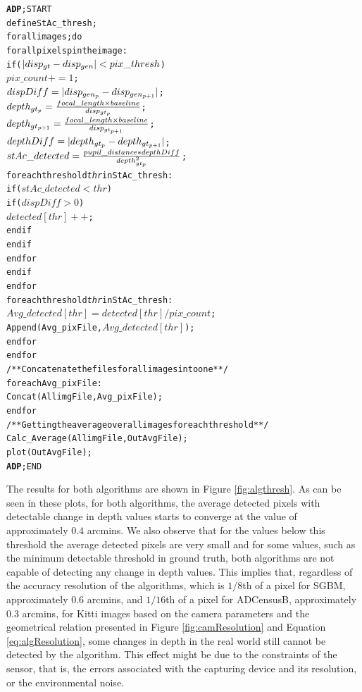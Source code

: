 \begin{alltt}
\textbf{ADP}; START
      define StAc\_thresh;
      for all images; do
         for all pixels p in the image:
            if (\( |disp\sb{gt}-disp\sb{gen}|<pix\_thresh\))
               \(pix\_count += 1\);
               \(dispDiff = |disp\sb{gen\sb{p}}-disp\sb{gen\sb{p+1}}|\);
               \(depth\sb{gt\sb{p}} = \frac{focal\_length \times baseline}{disp\sb{gt\sb{p}}}\);
               \(depth\sb{gt\sb{p+1}} = \frac{focal\_length \times baseline}{disp\sb{gt\sb{p+1}}}\);
               \(depthDiff = |depth\sb{gt\sb{p}}-depth\sb{gt\sb{p+1}}|\);
               \(stAc\_detected = \frac{pupil\_distance*depthDiff}{depth\sb{gt\sb{p}}\sp{2}}\);
               for each threshold \textit{thr} in StAc\_thresh:
                  if (\(stAc\_detected<thr\))
                     if (\(dispDiff>0\))
                        \(detected[thr]++\);
                     end if
                  end if
               end for
            end if
         end for
         for each threshold \textit{thr} in StAc\_thresh:
            \(Avg\_detected[thr] = detected[thr]/pix\_count\);
            Append(Avg\_pixFile, \(Avg\_detected[thr]\));
         end for
      end for
      /**Concatenate the files for all images into one **/
      for each Avg\_pixFile:
         Concat(AllimgFile,Avg\_pixFile);
      end for
      /**Getting the average over all images for each threshold**/
      Calc\_Average(AllimgFile, OutAvgFile);
      plot(OutAvgFile);
\textbf{ADP}; END
\end{alltt}
The results for both algorithms are shown in Figure \ref{fig:algthresh}.
As can be seen in these plots, for both algorithms, the average detected pixels with detectable change in depth values 
starts to converge at the value of approximately $0.4$ arcmins.
We also observe that for the values below this threshold the average detected pixels are very small and for some values, 
such as the minimum detectable threshold in ground truth,
both algorithms are not capable of detecting any change in depth values. 
This implies that, regardless of the accuracy resolution of the algorithms, which is $1/8$th of a pixel for SGBM, approximately $0.6$ arcmins,
and $1/16$th of a pixel for ADCensusB, approximately $0.3$ arcmins, for Kitti images based on the camera parameters and the geometrical 
relation presented in Figure \ref{fig:camResolution} and 
Equation \ref{eq:algResolution}, some changes in 
depth in the real world still cannot be detected by the algorithm. This effect might be due to the constraints of the sensor, that is, the errors associated with the capturing 
device and its resolution, or the environmental noise. 

